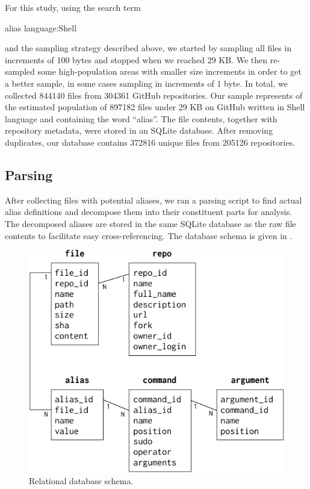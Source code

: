 For this study, using the search term
\begin{CVerbatim}
alias language:Shell
\end{CVerbatim}
and the sampling strategy described above, we started by sampling all files in increments of 100 bytes and stopped when we reached 29 KB.
We then re-sampled some high-population areas with smaller size increments in order to get a better sample, in some cases sampling in increments of 1 byte.
In total, we collected \num{844140} files from \num{304361} GitHub repositories.
Our sample represents  of the estimated population of \num{897182} files under 29 KB on GitHub written in Shell language and containing the word ``alias''.
The file contents, together with repository metadata, were stored in an SQLite database.
After removing duplicates, our database contains \num{372816} unique files from \num{205126} repositories.

\subsection{Parsing}

After collecting files with potential aliases, we ran a parsing script to find actual alias definitions and decompose them into their constituent parts for analysis.
The decomposed aliases are stored in the same SQLite database as the raw file contents to facilitate easy cross-referencing.
The database schema is given in .

\begin{figure}
    \centering
    \includegraphics[width=0.9\columnwidth]{graphics/schema.pdf}
    \caption{Relational database schema.}
    \label{fig:schema}
\end{figure}

